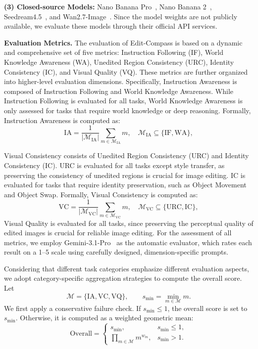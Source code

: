 \documentclass{llmxive}
\providecommand{\bench}{Edit-Compass}
\begin{document}
\hspace*{1em} \noindent\textbf{(3) Closed-source Models:} Nano Banana Pro~\cite{nanobananapro}, Nano Banana 2~\cite{google2026gemini31flashimagepreview},  Seedream4.5~\cite{seedream2025seedream}, and Wan2.7-Image~\cite{wan}. Since the model weights are not publicly available, we evaluate these models through their official API services. 

\textbf{Evaluation Metrics.}
\label{supp: Evaluation pipeline}
The evaluation of {\bench} is based on a dynamic and comprehensive set of five metrics: Instruction Following (IF), World Knowledge Awareness (WA), Unedited Region Consistency (URC), Identity Consistency (IC), and Visual Quality (VQ). These metrics are further organized into higher-level evaluation dimensions. Specifically, Instruction Awareness is composed of Instruction Following and World Knowledge Awareness. While Instruction Following is evaluated for all tasks, World Knowledge Awareness is only assessed for tasks that require world knowledge or deep reasoning. Formally, Instruction Awareness is computed as:
\[
\mathrm{IA} =
\frac{1}{|\mathcal{M}_{\mathrm{IA}}|}
\sum_{m \in \mathcal{M}_{\mathrm{IA}}} m,
\quad
\mathcal{M}_{\mathrm{IA}} \subseteq \{\mathrm{IF}, \mathrm{WA}\},
\]

Visual Consistency consists of Unedited Region Consistency (URC) and Identity Consistency (IC). URC is evaluated for all tasks except style transfer, as preserving the consistency of unedited regions is crucial for image editing. IC is evaluated for tasks that require identity preservation, such as Object Movement and Object Swap. Formally, Visual Consistency is computed as:
\[
\mathrm{VC} =
\frac{1}{|\mathcal{M}_{\mathrm{VC}}|}
\sum_{m \in \mathcal{M}_{\mathrm{VC}}} m,
\quad
\mathcal{M}_{\mathrm{VC}} \subseteq \{\mathrm{URC}, \mathrm{IC}\},
\]
Visual Quality is evaluated for all tasks, since preserving the perceptual quality of edited images is crucial for reliable image editing. For the assessment of all metrics, we employ Gemini-3.1-Pro~\cite{gemini3pro} as the automatic evaluator, which rates each result on a 1--5 scale using carefully designed, dimension-specific prompts.

 
Considering that different task categories emphasize different evaluation aspects, we adopt category-specific aggregation strategies to compute the overall score. Let
\[
\mathcal{M}=\{\mathrm{IA},\mathrm{VC},\mathrm{VQ}\},
\qquad
s_{\min}=\min_{m\in\mathcal{M}} m.
\]
We first apply a conservative failure check. If \(s_{\min}\leq 1\), the overall score is set to \(s_{\min}\). Otherwise, it is computed as a weighted geometric mean:
\[
\mathrm{Overall} =
\begin{cases}
s_{\min}, & s_{\min}\leq 1, \\[3pt]
\prod_{m\in\mathcal{M}} m^{w_m}, & s_{\min}>1.
\end{cases}
\]
\end{document}
